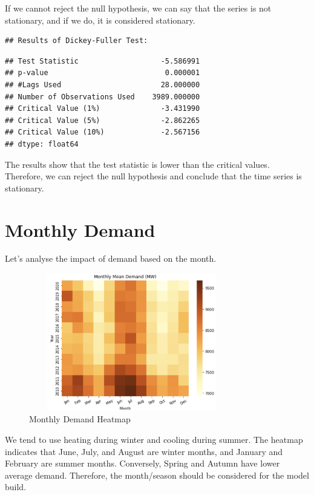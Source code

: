 \documentclass[mstat,12pt]{unswthesis}
\begin{document}
If we cannot reject the null hypothesis, we can say that the series is
not stationary, and if we do, it is considered stationary.

\begin{verbatim}
## Results of Dickey-Fuller Test:
\end{verbatim}

\begin{verbatim}
## Test Statistic                   -5.586991
## p-value                           0.000001
## #Lags Used                       28.000000
## Number of Observations Used    3989.000000
## Critical Value (1%)              -3.431990
## Critical Value (5%)              -2.862265
## Critical Value (10%)             -2.567156
## dtype: float64
\end{verbatim}

The results show that the test statistic is lower than the critical
values. Therefore, we can reject the null hypothesis and conclude that
the time series is stationary.

\section{Monthly Demand}\label{monthly-demand}

Let's analyse the impact of demand based on the month.

\begin{figure}[H]
\centering
\includegraphics[width=0.80\textwidth,height=6cm]{monthly_heat.png}
\caption{Monthly Demand Heatmap}
\label{monthly_heat.png}
\end{figure}

We tend to use heating during winter and cooling during summer. The
heatmap indicates that June, July, and August are winter months, and
January and February are summer months. Conversely, Spring and Autumn
have lower average demand. Therefore, the month/season should be
considered for the model build.
\end{document}
